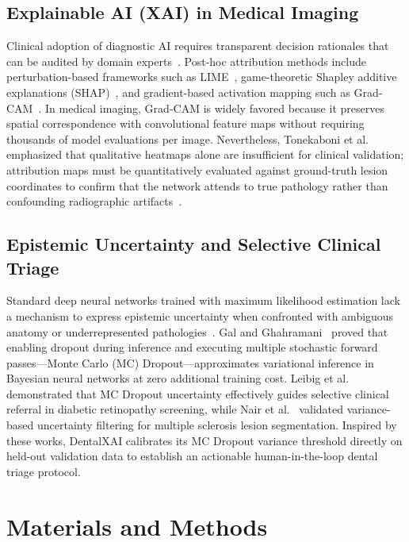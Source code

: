 \documentclass[review]{elsarticle}
\begin{document}
\subsection{Explainable AI (XAI) in Medical Imaging}
Clinical adoption of diagnostic AI requires transparent decision rationales that can be audited by domain experts~\cite{kelly2019key, tjoa2021survey}. Post-hoc attribution methods include perturbation-based frameworks such as LIME~\cite{ribeiro2016why}, game-theoretic Shapley additive explanations (SHAP)~\cite{lundberg2017unified}, and gradient-based activation mapping such as Grad-CAM~\cite{selvaraju2017gradcam}. In medical imaging, Grad-CAM is widely favored because it preserves spatial correspondence with convolutional feature maps without requiring thousands of model evaluations per image. Nevertheless, Tonekaboni et al.~\cite{tonekaboni2019clinicians} emphasized that qualitative heatmaps alone are insufficient for clinical validation; attribution maps must be quantitatively evaluated against ground-truth lesion coordinates to confirm that the network attends to true pathology rather than confounding radiographic artifacts~\cite{zech2018variable}.

\subsection{Epistemic Uncertainty and Selective Clinical Triage}
Standard deep neural networks trained with maximum likelihood estimation lack a mechanism to express epistemic uncertainty when confronted with ambiguous anatomy or underrepresented pathologies~\cite{blundell2015weight, guo2017calibration}. Gal and Ghahramani~\cite{gal2016dropout} proved that enabling dropout during inference and executing multiple stochastic forward passes---Monte Carlo (MC) Dropout---approximates variational inference in Bayesian neural networks at zero additional training cost. Leibig et al.~\cite{leibig2017uncertainty} demonstrated that MC Dropout uncertainty effectively guides selective clinical referral in diabetic retinopathy screening, while Nair et al.~\cite{nair2020uncertainty} validated variance-based uncertainty filtering for multiple sclerosis lesion segmentation. Inspired by these works, DentalXAI calibrates its MC Dropout variance threshold directly on held-out validation data to establish an actionable human-in-the-loop dental triage protocol.

\section{Materials and Methods}
\label{sec:methods}
\end{document}
